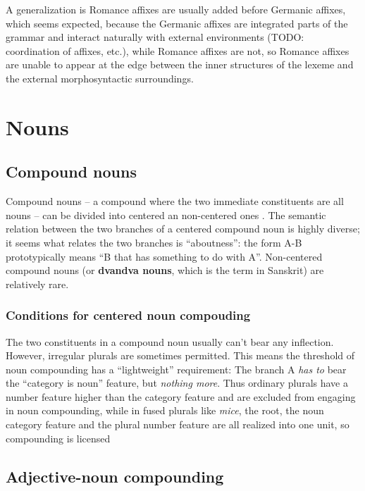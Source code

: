 \documentclass[UTF8, a4paper, oneside, scheme=plain]{ctexrep}
\newcommand*{\citesec}[1]{\S~{#1}}
\newcommand*{\citepage}[1]{pp.~{#1}}
\newcommand*{\concept}[1]{\textbf{#1}}
\newcommand{\corpus}[1]{\emph{#1}}
\begin{document}
A generalization is Romance affixes are usually added before Germanic affixes,
which seems expected,
because the Germanic affixes are integrated parts of the grammar 
and interact naturally with external environments
(TODO: coordination of affixes, etc.),
while Romance affixes are not,
so Romance affixes are unable to appear at the edge 
between the inner structures of the lexeme and the external morphosyntactic surroundings.

\section{Nouns}

\subsection{Compound nouns}\label{sec:pos.noun.compound}

Compound nouns -- a compound where the two immediate constituents are all nouns -- 
can be divided into centered an non-centered ones
\citep[\citepage{1646-1648}]{cgel}.
The semantic relation between the two branches of a centered compound noun
is highly diverse; 
it seems what relates the two branches is ``aboutness'':
the form A-B prototypically means ``B that has something to do with A''.
Non-centered compound nouns 
(or \concept{dvandva nouns}, which is the term in Sanskrit) 
are relatively rare.

\subsubsection{Conditions for centered noun compouding}

The two constituents in a compound noun usually can't bear any inflection.
However, irregular plurals are sometimes permitted.
This means the threshold of noun compounding has a ``lightweight'' requirement:
The branch A \emph{has to} bear the ``category is noun'' feature,
but \emph{nothing more}.
Thus ordinary plurals have a number feature higher than the category feature 
and are excluded from engaging in noun compounding,
while in fused plurals like \corpus{mice},
the root, the noun category feature and the plural number feature 
are all realized into one unit,
so compounding is licensed \citep[\citesec{7.1}]{siddiqi2009syntax}

\subsection{Adjective-noun compounding}
\end{document}
